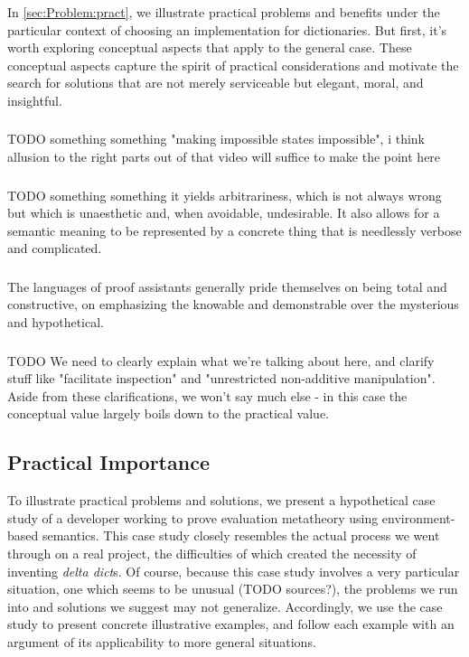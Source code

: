 \documentclass[nonacm]{acmart}
\newcommand{\dd}{\emph{delta dict}}
\theoremstyle{slplain}
\numberwithin{thm}{section}
\begin{document}
In \autoref{sec:Problem:pract}, we illustrate practical problems and benefits under the particular context
of choosing an implementation for dictionaries. But first, it's worth exploring conceptual aspects that
apply to the general case. These conceptual aspects capture the spirit of practical considerations and
motivate the search for solutions that are not merely serviceable but elegant, moral, and insightful.

\subsubsection{\SemTot}
\label{sec:Problem:concept:SemTot}
TODO something something "making impossible states impossible", i think allusion to the right parts out of that
video will suffice to make the point here

\subsubsection{\SemInj}
\label{sec:Problem:concept:SemInj}
TODO something something it yields arbitrariness, which is not always wrong but which is unaesthetic and, when
avoidable, undesirable. It also allows for a semantic meaning to be represented by a concrete thing that is
needlessly verbose and complicated.

\subsubsection{\EqDec}
\label{sec:Problem:concept:EqDec}
The languages of proof assistants generally pride themselves on being total and constructive, on emphasizing
the knowable and demonstrable over the mysterious and hypothetical.

\subsubsection{\EzDstr}
\label{sec:Problem:concept:EzDstr}
TODO We need to clearly explain what we're talking about here, and clarify stuff like "facilitate inspection"
and "unrestricted non-additive manipulation". Aside from these clarifications, we won't say much else - in
this case the conceptual value largely boils down to the practical value.

\subsection{Practical Importance}
\label{sec:Problem:pract}
To illustrate practical problems and solutions, we present a hypothetical case study of a developer working to
prove evaluation metatheory using environment-based semantics. This case study closely resembles the actual process we went
through on a real project, the difficulties of which created the necessity of inventing {\dd}s. Of course,
because this case study involves a very particular situation, one which seems to be unusual (TODO sources?),
the problems we run into and solutions we suggest may not generalize. Accordingly, we use the case study to
present concrete illustrative examples, and follow each example with an argument of its applicability to more
general situations.
\end{document}
